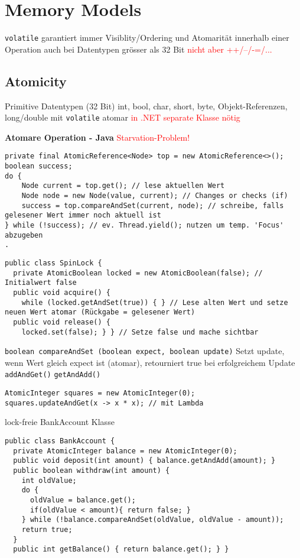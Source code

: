 \section{Memory Models}

\lstinline{volatile} garantiert immer Visiblity/Ordering und Atomarität innerhalb einer Operation auch bei Datentypen grösser als 32 Bit \textcolor{red}{nicht aber ++/--/-=/...}

\subsection{Atomicity}
Primitive Datentypen (32 Bit) int, bool, char, short, byte, Objekt-Referenzen, long/double mit \lstinline{volatile} atomar \textcolor{red}{in .NET separate Klasse nötig}


\textbf{Atomare Operation - Java} \textcolor{red}{Starvation-Problem!}

\begin{lstlisting}
private final AtomicReference<Node> top = new AtomicReference<>();
boolean success;
do {
    Node current = top.get(); // lese aktuellen Wert
    Node node = new Node(value, current); // Changes or checks (if)
    success = top.compareAndSet(current, node); // schreibe, falls gelesener Wert immer noch aktuell ist
} while (!success); // ev. Thread.yield(); nutzen um temp. 'Focus' abzugeben
.
\end{lstlisting}

\begin{lstlisting}
public class SpinLock {
  private AtomicBoolean locked = new AtomicBoolean(false); // Initialwert false
  public void acquire() {
    while (locked.getAndSet(true)) { } // Lese alten Wert und setze neuen Wert atomar (Rückgabe = gelesener Wert)
  public void release() {
    locked.set(false); } } // Setze false und mache sichtbar
\end{lstlisting}

\lstinline{boolean compareAndSet (boolean expect, boolean update)} Setzt update, wenn Wert gleich expect ist (atomar), retourniert true bei erfolgreichem Update \lstinline{addAndGet()} \lstinline{getAndAdd()}

\begin{lstlisting}
AtomicInteger squares = new AtomicInteger(0);
squares.updateAndGet(x -> x * x); // mit Lambda
\end{lstlisting}

lock-freie BankAccount Klasse

\begin{lstlisting}
public class BankAccount {
  private AtomicInteger balance = new AtomicInteger(0);
  public void deposit(int amount) { balance.getAndAdd(amount); }
  public boolean withdraw(int amount) {
    int oldValue;
    do {
      oldValue = balance.get();
      if(oldValue < amount){ return false; }
    } while (!balance.compareAndSet(oldValue, oldValue - amount));
    return true;
  }
  public int getBalance() { return balance.get(); } }
\end{lstlisting}

